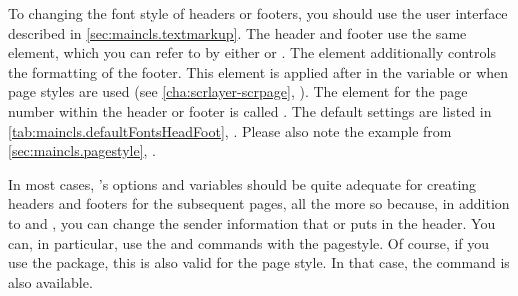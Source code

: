 \BeginIndexGroup
{}%
%
%
%
To changing the font style of headers or footers, you should use the user
interface described in \autoref{sec:maincls.textmarkup}. The header and footer
use the same element, which you can refer to by either
 or
. The
 element
additionally controls the formatting of the footer. This element is applied
after  in the
 variable or
when  page styles are
used (see \autoref{cha:scrlayer-scrpage},
). The element for the page
number within the header or footer is called
. The default
settings are listed in \autoref{tab:maincls.defaultFontsHeadFoot},
. Please also note the example
from \autoref{sec:maincls.pagestyle}, .
%
\EndIndexGroup
%
\EndIndexGroup


\begin{Declaration}
\end{Declaration}
In most cases, \KOMAScript{}'s options and variables should be quite adequate
for creating headers and footers for the
subsequent pages, all the more so because, in addition to  and
, you can change the sender information that 
or  puts in the header. You can, in particular, use the
 and 
commands with the %
 pagestyle. Of course, if you use the
\hyperref[cha:scrlayer-scrpage]{}%
%
package, this is also valid for the
 page style. In that case, the
 command is also
available.

